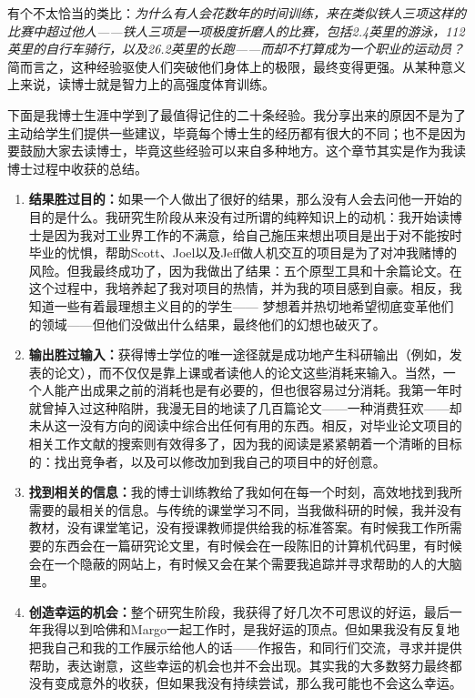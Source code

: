 \documentclass[letter,12pt]{book}
\begin{document}
\begin{CJK}{UTF8}{gbsn}
有个不太恰当的类比：\emph{为什么有人会花数年的时间训练，来在类似铁人三项这样的比赛中超过他人——铁人三项是一项极度折磨人的比赛，包括2.4英里的游泳，112英里的自行车骑行，以及26.2英里的长跑——而却不打算成为一个职业的运动员？}简而言之，这种经验驱使人们突破他们身体上的极限，最终变得更强。从某种意义上来说，读博士就是智力上的高强度体育训练。

\breakline

下面是我博士生涯中学到了最值得记住的二十条经验。我分享出来的原因不是为了主动给学生们提供一些建议，毕竟每个博士生的经历都有很大的不同；也不是因为要鼓励大家去读博士，毕竟这些经验可以来自多种地方。这个章节其实是作为我读博士过程中收获的总结。
\begin{enumerate}
  \item \textbf{结果胜过目的：}如果一个人做出了很好的结果，那么没有人会去问他一开始的目的是什么。我研究生阶段从来没有过所谓的纯粹知识上的动机：我开始读博士是因为我对工业界工作的不满意，给自己施压来想出项目是出于对不能按时毕业的忧惧，帮助Scott、Joel以及Jeff做人机交互的项目是为了对冲我赌博的风险。但我最终成功了，因为我做出了结果：五个原型工具和十余篇论文。在这个过程中，我培养起了我对项目的热情，并为我的项目感到自豪。相反，我知道一些有着最理想主义目的的学生—— 梦想着并热切地希望彻底变革他们的领域——但他们没做出什么结果，最终他们的幻想也破灭了。
  \item \textbf{输出胜过输入：}获得博士学位的唯一途径就是成功地产生科研输出（例如，发表的论文），而不仅仅是靠上课或者读他人的论文这些消耗来输入。当然，一个人能产出成果之前的消耗也是有必要的，但也很容易过分消耗。我第一年时就曾掉入过这种陷阱，我漫无目的地读了几百篇论文——一种消费狂欢——却未从这一没有方向的阅读中综合出任何有用的东西。相反，对毕业论文项目的相关工作文献的搜索则有效得多了，因为我的阅读是紧紧朝着一个清晰的目标的：找出竞争者，以及可以修改加到我自己的项目中的好创意。
  \item \textbf{找到相关的信息：}我的博士训练教给了我如何在每一个时刻，高效地找到我所需要的最相关的信息。与传统的课堂学习不同，当我做科研的时候，我并没有教材，没有课堂笔记，没有授课教师提供给我的标准答案。有时候我工作所需要的东西会在一篇研究论文里，有时候会在一段陈旧的计算机代码里，有时候会在一个隐蔽的网站上，有时候又会在某个需要我追踪并寻求帮助的人的大脑里。
  \item \textbf{创造幸运的机会：}整个研究生阶段，我获得了好几次不可思议的好运，最后一年我得以到哈佛和Margo一起工作时，是我好运的顶点。但如果我没有反复地把我自己和我的工作展示给他人的话——作报告，和同行们交流，寻求并提供帮助，表达谢意，这些幸运的机会也并不会出现。其实我的大多数努力最终都没有变成意外的收获，但如果我没有持续尝试，那么我可能也不会这么幸运。

\end{enumerate}
\end{CJK}
\end{document}
